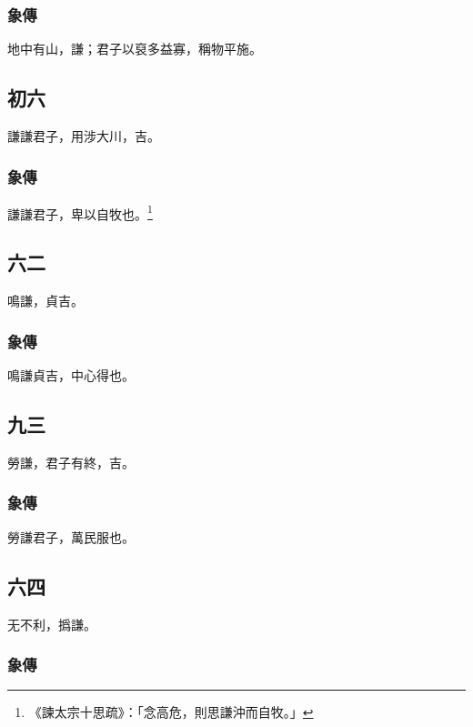 \documentclass[12pt, a4paper]{article}
\begin{document}
\subsubsection{象傳}

地中有山，謙；君子以裒多益寡，稱物平施。

\subsection{初六}

謙謙君子，用涉大川，吉。

\subsubsection{象傳}

謙謙\textsf{君}子，卑以自\textsf{牧}也。\footnote{《諫太宗十思疏》：「念高危，則思謙沖而自牧。」}

\subsection{六二}

鳴謙，貞吉。

\subsubsection{象傳}

鳴謙貞吉，中心得也。

\subsection{九三}

勞謙，君子有終，吉。

\subsubsection{象傳}

勞謙君子，萬民服也。

\subsection{六四}

无不利，撝謙。

\subsubsection{象傳}
\end{document}
